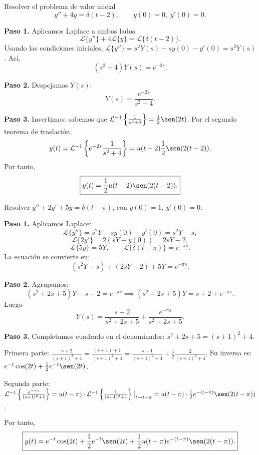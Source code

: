 \begin{example}
Resolver el problema de valor inicial
\[
y'' + 4y = \delta(t-2),\qquad y(0)=0,\ y'(0)=0.
\]
\begin{myproof}
\textbf{Paso 1.} Aplicamos Laplace a ambos lados:
\[
\mathcal{L}\{y''\} + 4\mathcal{L}\{y\} = \mathcal{L}\{\delta(t-2)\}.
\]
Usando las condiciones iniciales, $\mathcal{L}\{y''\}=s^2Y(s)-s y(0)-y'(0)=s^2Y(s)$. Así,
\[
(s^2+4)Y(s) = e^{-2s}.
\]

\textbf{Paso 2.} Despejamos $Y(s)$:
\[
Y(s) = \frac{e^{-2s}}{s^2+4}.
\]

\textbf{Paso 3.} Invertimos: sabemos que $\mathcal{L}^{-1}\left\{\frac{1}{s^2+4}\right\} = \frac{1}{2}\sen(2t)$. Por el segundo teorema de traslación,
\[
y(t) = \mathcal{L}^{-1}\left\{e^{-2s}\frac{1}{s^2+4}\right\} = u(t-2)\frac{1}{2}\sen(2(t-2)).
\]
Por tanto,
\[
\boxed{y(t) = \frac{1}{2}u(t-2)\sen(2(t-2)).}
\]
\end{myproof}
\end{example}

\begin{example}
Resolver $y'' + 2y' + 5y = \delta(t-\pi)$, con $y(0)=1,\ y'(0)=0$.
\begin{myproof}
\textbf{Paso 1.} Aplicamos Laplace:
\[
\mathcal{L}\{y''\} = s^2Y - s y(0) - y'(0) = s^2Y - s,
\]
\[
\mathcal{L}\{2y'\} = 2(sY - y(0)) = 2sY - 2,
\]
\[
\mathcal{L}\{5y\} = 5Y,\qquad \mathcal{L}\{\delta(t-\pi)\}=e^{-\pi s}.
\]
La ecuación se convierte en:
\[
(s^2Y - s) + (2sY - 2) + 5Y = e^{-\pi s}.
\]

\textbf{Paso 2.} Agrupamos:
\[
(s^2+2s+5)Y - s - 2 = e^{-\pi s} \implies (s^2+2s+5)Y = s+2 + e^{-\pi s}.
\]
Luego
\[
Y(s) = \frac{s+2}{s^2+2s+5} + \frac{e^{-\pi s}}{s^2+2s+5}.
\]

\textbf{Paso 3.} Completamos cuadrado en el denominador: $s^2+2s+5 = (s+1)^2+4$.

Primera parte: $\frac{s+2}{(s+1)^2+4} = \frac{(s+1)+1}{(s+1)^2+4} = \frac{s+1}{(s+1)^2+4} + \frac{1}{2}\frac{2}{(s+1)^2+4}$.
Su inversa es: $e^{-t}\cos(2t) + \frac{1}{2}e^{-t}\sen(2t)$.

Segunda parte: $\mathcal{L}^{-1}\left\{\frac{e^{-\pi s}}{(s+1)^2+4}\right\} = u(t-\pi) \cdot \mathcal{L}^{-1}\left\{\frac{1}{(s+1)^2+4}\right\}\big|_{t\to t-\pi} = u(t-\pi)\cdot \frac{1}{2}e^{-(t-\pi)}\sen(2(t-\pi))$.

Por tanto,
\[
\boxed{y(t) = e^{-t}\cos(2t) + \frac{1}{2}e^{-t}\sen(2t) + \frac{1}{2}u(t-\pi)e^{-(t-\pi)}\sen(2(t-\pi)).}
\]
\end{myproof}
\end{example}

